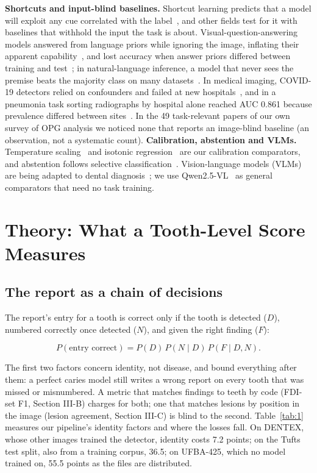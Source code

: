 \documentclass[conference]{IEEEtran}
\begin{document}
\textbf{Shortcuts and input-blind baselines.} Shortcut learning predicts that a model will exploit any cue correlated with the label~\cite{geirhos2020shortcut}, and other fields test for it with baselines that withhold the input the task is about. Visual-question-answering models answered from language priors while ignoring the image, inflating their apparent capability~\cite{goyal2017making}, and lost accuracy when answer priors differed between training and test~\cite{agrawal2018dont}; in natural-language inference, a model that never sees the premise beats the majority class on many datasets~\cite{poliak2018hypothesis}. In medical imaging, COVID-19 detectors relied on confounders and failed at new hospitals~\cite{degrave2021ai}, and in a pneumonia task sorting radiographs by hospital alone reached AUC 0.861 because prevalence differed between sites~\cite{zech2018variable}. In the 49 task-relevant papers of our own survey of OPG analysis we noticed none that reports an image-blind baseline (an observation, not a systematic count). \textbf{Calibration, abstention and VLMs.} Temperature scaling~\cite{guo2017calibration} and isotonic regression~\cite{zadrozny2002isotonic} are our calibration comparators, and abstention follows selective classification~\cite{geifman2017selective}. Vision-language models (VLMs) are being adapted to dental diagnosis~\cite{meng2026dentvlm}; we use Qwen2.5-VL~\cite{bai2025qwen25vl} as general comparators that need no task training.

\section{Theory: What a Tooth-Level Score Measures}

\subsection{The report as a chain of decisions}

The report's entry for a tooth is correct only if the tooth is detected ($D$), numbered correctly once detected ($N$), and given the right finding ($F$):

\begin{equation}
P(\text{entry correct}) = P(D)\, P(N \mid D)\, P(F \mid D, N).
\end{equation}

The first two factors concern identity, not disease, and bound everything after them: a perfect caries model still writes a wrong report on every tooth that was missed or misnumbered. A metric that matches findings to teeth by code (FDI-set F1, Section III-B) charges for both; one that matches lesions by position in the image (lesion agreement, Section III-C) is blind to the second. Table~\ref{tab:1} measures our pipeline's identity factors and where the losses fall. On DENTEX, whose other images trained the detector, identity costs 7.2 points; on the Tufts test split, also from a training corpus, 36.5; on UFBA-425, which no model trained on, 55.5 points as the files are distributed.
\end{document}
